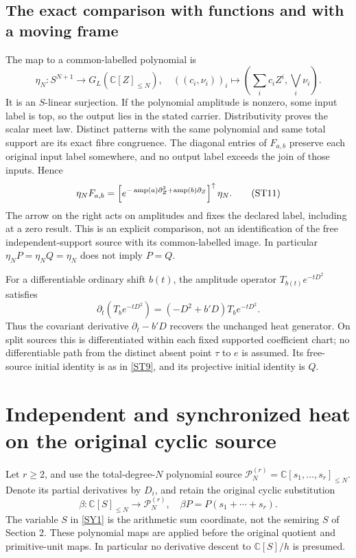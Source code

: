 \documentclass[11pt,a4paper]{article}
\theoremstyle{definition}\newtheorem{definition}[theorem]{Definition}
\newcommand{\C}{\mathbb C}\newcommand{\R}{\mathbb R}\newcommand{\N}{\mathbb N}
\begin{document}
\subsection{The exact comparison with functions and with a moving frame}
The map to a common-labelled polynomial is
\begin{equation}
 \eta_N:S^{N+1}\longrightarrow G_L(\C[Z]_{\le N}),\quad
 ((c_i,\nu_i))_i\longmapsto
 \left(\sum_i c_iZ^i,\bigvee_i\nu_i\right).                     \tag{ST10}\label{ST10}
\end{equation}
It is an $S$-linear surjection. If the polynomial amplitude is nonzero, some input label is top, so the output lies in the stated carrier. Distributivity proves the scalar meet law. Distinct patterns with the same polynomial and same total support are its exact fibre congruence. The diagonal entries of $F_{a,b}$ preserve each original input label somewhere, and no output label exceeds the join of those inputs. Hence
\begin{equation}
 \eta_NF_{a,b}
 =\left[e^{-\operatorname{amp}(a)\partial_Z^2+\operatorname{amp}(b)\partial_Z}\right]^\uparrow
 \eta_N.                                                        \tag{ST11}\label{ST11}
\end{equation}
The arrow on the right acts on amplitudes and fixes the declared label, including at a zero result. This is an explicit comparison, not an identification of the free independent-support source with its common-labelled image. In particular $\eta_NP=\eta_NQ=\eta_N$ does not imply $P=Q$.

For a differentiable ordinary shift $b(t)$, the amplitude operator
$T_{b(t)}e^{-tD^2}$ satisfies
\begin{equation}
 \partial_t(T_be^{-tD^2})=(-D^2+b'D)T_be^{-tD^2}.
                                                               \tag{ST12}\label{ST12}
\end{equation}
Thus the covariant derivative $\partial_t-b'D$ recovers the unchanged heat generator. On split sources this is differentiated within each fixed supported coefficient chart; no differentiable path from the distinct absent point $\tau$ to $e$ is assumed. Its free-source initial identity is as in \eqref{ST9}, and its projective initial identity is $Q$.

\section{Independent and synchronized heat on the original cyclic source}
Let $r\ge2$, and use the total-degree-$N$ polynomial source
$\mathcal P_N^{(r)}=\C[s_1,\ldots,s_r]_{\le N}$. Denote its partial derivatives by $D_i$, and retain the original cyclic substitution
\begin{equation}
 \beta:\C[S]_{\le N}\longrightarrow\mathcal P_N^{(r)},\quad
 \beta P=P(s_1+\cdots+s_r).                                    \tag{SY1}\label{SY1}
\end{equation}
The variable $S$ in \eqref{SY1} is the arithmetic sum coordinate, not the semiring $S$ of Section 2. These polynomial maps are applied before the original quotient and primitive-unit maps. In particular no derivative descent to $\C[S]/h$ is presumed.
\end{document}
